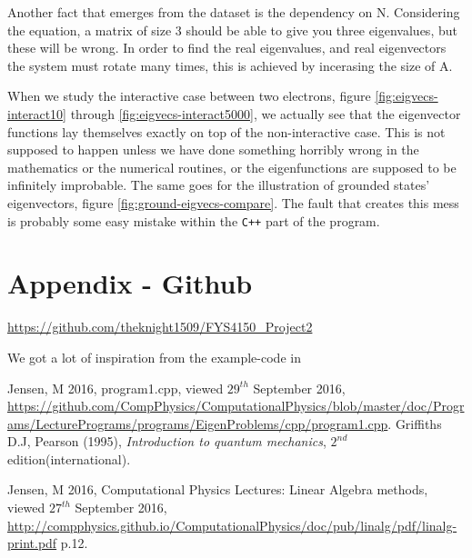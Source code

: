 \documentclass[11pt,a4paper,notitlepage]{article}
\begin{document}
Another fact that emerges from the dataset is the dependency on N. Considering the equation, a matrix of size 3 should be able to give you three eigenvalues, but these will be wrong. In order to find the real eigenvalues, and real eigenvectors the system must rotate many times, this is achieved by incerasing the size of A.

When we study the interactive case between two electrons, figure \ref{fig:eigvecs-interact10} through \ref{fig:eigvecs-interact5000}, we actually see that the eigenvector functions lay themselves exactly on top of the non-interactive case. This is not supposed to happen unless we have done something horribly wrong in the mathematics or the numerical routines, or the eigenfunctions are supposed to be infinitely improbable. The same goes for the illustration of grounded states' eigenvectors, figure \ref{fig:ground-eigvecs-compare}. The fault that creates this mess is probably some easy mistake within the \verb|C++| part of the program.

\section{Appendix - Github} \label{section:github}
\url{https://github.com/theknight1509/FYS4150_Project2}


We got a lot of inspiration from the example-code in \cite[web-site]{example_code}

\begin{thebibliography}{9}
  Jensen, M 2016,
  program1.cpp,
  viewed $29^{th}$ September 2016,
  \url{https://github.com/CompPhysics/ComputationalPhysics/blob/master/doc/Programs/LecturePrograms/programs/EigenProblems/cpp/program1.cpp}.
  Griffiths D.J, 
  Pearson (1995),
  \emph{Introduction to quantum mechanics},
  $2^{nd}$ edition(international).
  
	Jensen, M 2016, 
	Computational Physics Lectures: Linear
Algebra methods, 
	viewed $27^{th}$ September 2016, 
	\url{http://compphysics.github.io/ComputationalPhysics/doc/pub/linalg/pdf/linalg-print.pdf} p.12. 

\end{thebibliography}
\end{document}
